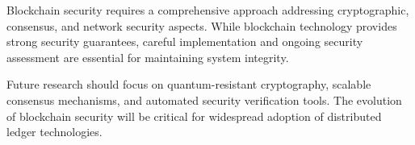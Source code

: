Blockchain security requires a comprehensive approach addressing cryptographic, consensus, and network security aspects. While blockchain technology provides strong security guarantees, careful implementation and ongoing security assessment are essential for maintaining system integrity.

Future research should focus on quantum-resistant cryptography, scalable consensus mechanisms, and automated security verification tools. The evolution of blockchain security will be critical for widespread adoption of distributed ledger technologies.

